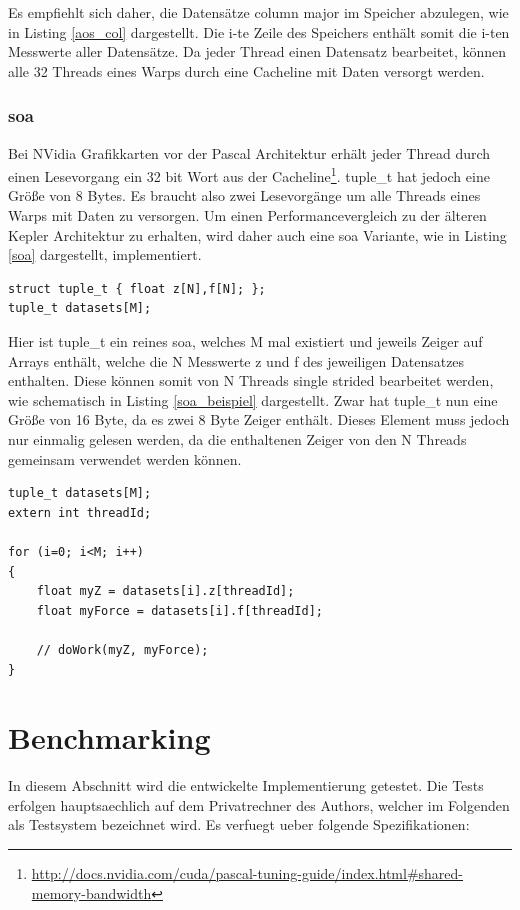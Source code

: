Es empfiehlt sich daher, die Datensätze column major im Speicher abzulegen, wie in Listing \ref{aos_col} dargestellt. Die i-te Zeile des Speichers enthält somit die i-ten Messwerte aller Datensätze. Da jeder Thread einen Datensatz bearbeitet, können alle 32 Threads eines Warps durch eine Cacheline mit Daten versorgt werden.


\subsection{\acrlong{soa}}
Bei NVidia Grafikkarten vor der Pascal Architektur erhält jeder Thread durch einen Lesevorgang ein 32 bit Wort aus der Cacheline\footnote{\href{http://docs.nvidia.com/cuda/pascal-tuning-guide/index.html\#shared-memory-bandwidth}{http://docs.nvidia.com/cuda/pascal-tuning-guide/index.html\#shared-memory-bandwidth}}. tuple\_t hat jedoch eine Größe von 8 Bytes. 
Es braucht also zwei Lesevorgänge um alle Threads eines Warps mit Daten zu versorgen.
Um einen Performancevergleich zu der älteren Kepler Architektur zu erhalten, wird daher auch eine \gls{soa} Variante, wie in Listing \ref{soa} dargestellt, implementiert.

\begin{lstlisting}[label=soa,caption=Datenlayout \gls{soa}]
struct tuple_t { float z[N],f[N]; };
tuple_t datasets[M];
\end{lstlisting}

Hier ist tuple\_t ein reines \gls{soa}, welches M mal existiert und jeweils Zeiger auf Arrays enthält, welche die N Messwerte z und f des jeweiligen Datensatzes enthalten. Diese können somit von N Threads single strided bearbeitet werden, wie schematisch in Listing \ref{soa_beispiel} dargestellt.
Zwar hat tuple\_t nun eine Größe von 16 Byte, da es zwei 8 Byte Zeiger enthält. Dieses Element muss jedoch nur einmalig gelesen werden, da die enthaltenen Zeiger von den N Threads gemeinsam verwendet werden können.

\begin{lstlisting}[label=soa_beispiel,caption=Bearbeitung eines \gls{soa}]
tuple_t datasets[M];
extern int threadId;

for (i=0; i<M; i++)
{
    float myZ = datasets[i].z[threadId];
    float myForce = datasets[i].f[threadId];
    
    // doWork(myZ, myForce);
}
\end{lstlisting}


\chapter{Benchmarking}
In diesem Abschnitt wird die entwickelte Implementierung getestet. Die Tests erfolgen hauptsaechlich auf dem Privatrechner des Authors, welcher im Folgenden als Testsystem bezeichnet wird. Es verfuegt ueber folgende Spezifikationen:

